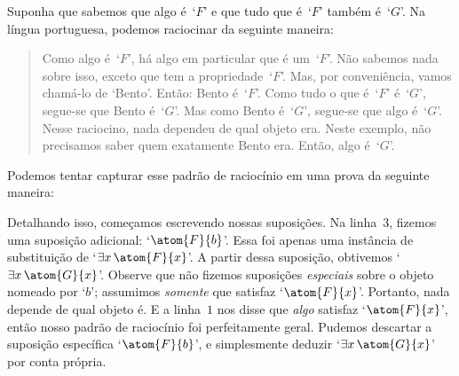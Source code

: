  Suponha que sabemos que algo \'e~`$F$' e que tudo que \'e~`$F$' tamb\'em \'e~`$G$'. Na l\'ingua portuguesa, podemos raciocinar da seguinte maneira:
	\begin{quote}
		Como algo \'e~`$F$', h\'a algo em particular que \'e um~`$F$'. N\~ao sabemos nada sobre isso, exceto que tem a propriedade~`$F$'.  Mas, por conveni\^encia, vamos cham\'a-lo de `Bento'. Ent\~ao: Bento \'e~`$F$'. Como tudo o que \'e~`$F$' \'e~`$G$', segue-se que Bento \'e~`$G$'. Mas como Bento \'e~`$G$', segue-se que algo \'e~`$G$'. Nesse raciocino,  nada dependeu  de qual objeto era. Neste exemplo, n\~ao precisamos saber quem exatamente Bento era.   Ent\~ao, algo \'e~`$G$'.
	\end{quote}
 Podemos tentar capturar esse padr\~ao de racioc\'inio em uma prova da seguinte maneira:
\begin{fitchproof}
	\open
		 
	\close
\end{fitchproof}\noindent
Detalhando isso, come\c camos escrevendo nossas suposi\c c\~oes. Na linha~$3$, fizemos uma suposi\c c\~ao adicional: `$\atom{F}{b}$'. Essa foi apenas uma inst\^ancia de substitui\c c\~ao de `$\exists x\,\atom{F}{x}$'. A partir dessa suposi\c c\~ao, obtivemos `$\exists x\,\atom{G}{x}$'. Observe que n\~ao fizemos suposi\c c\~oes \emph{especiais} sobre o objeto nomeado por `$b$'; assumimos \emph{somente} que satisfaz `$\atom{F}{x}$'. Portanto, nada depende de qual objeto \'e. E a linha~$1$ nos disse que \emph{algo} satisfaz `$\atom{F}{x}$', ent\~ao nosso padr\~ao de racioc\'inio foi perfeitamente geral. Pudemos descartar a suposi\c c\~ao espec\'ifica `$\atom{F}{b}$', e simplesmente deduzir `$\exists x\,\atom{G}{x}$' por conta pr\'opria.
 


